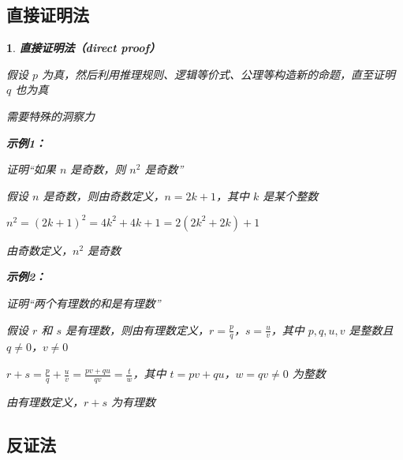 \documentclass[UTF8]{report}
\theoremstyle{MyLineTheoremStyle} %
\theoremstyle{MyBlockTheoremStyle} %
\theoremstyle{MySubsubsectionStyle} %
\newtheorem{definition}{}
\begin{document}
\subsection{直接证明法}

\begin{definition}
    \textbf{直接证明法（direct proof）}\par
    假设 $p$ 为真，然后利用推理规则、逻辑等价式、公理等构造新的命题，直至证明 $q$ 也为真\par
    需要特殊的洞察力\par

    \textbf{示例1：}\par
    证明“如果 $n$ 是奇数，则 $n^2$ 是奇数”\par
    假设 $n$ 是奇数，则由奇数定义，$n = 2k + 1$，其中 $k$ 是某个整数\par
    $n^2 = (2k + 1)^2 = 4k^2 + 4k + 1 = 2(2k^2 + 2k) + 1$\par
    由奇数定义，$n^2$ 是奇数\par

    \textbf{示例2：}\par
    证明“两个有理数的和是有理数”\par
    假设 $r$ 和 $s$ 是有理数，则由有理数定义，$r = \frac{p}{q}$，$s = \frac{u}{v}$，其中 $p, q, u, v$ 是整数且 $q \neq 0$，$v \neq 0$\par
    $r + s = \frac{p}{q} + \frac{u}{v} = \frac{pv + qu}{qv} = \frac{t}{w}$，其中 $t = pv + qu$，$w = qv \neq 0$ 为整数\par
    由有理数定义，$r + s$ 为有理数\par
\end{definition}

\subsection{反证法}
\end{document}
